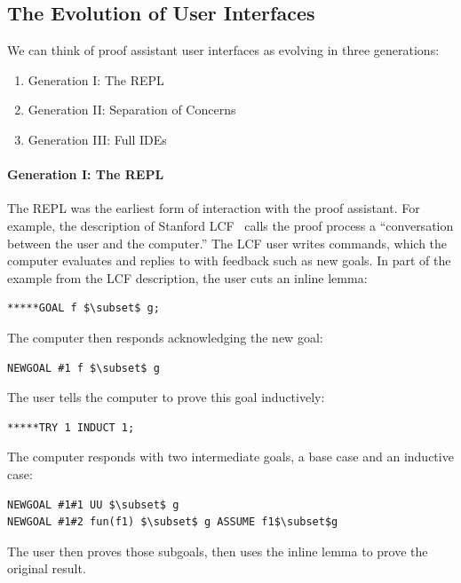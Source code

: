 \subsection{The Evolution of User Interfaces}
\label{sec:uievolve}
We can think of proof assistant user interfaces as evolving in three generations:

\begin{enumerate}
\item Generation I: The REPL
\item Generation II: Separation of Concerns
\item Generation III: Full IDEs
\end{enumerate}

\paragraph{Generation I: The REPL}


The REPL was the earliest form of interaction with the proof assistant.
For example, the description of Stanford LCF~\citep{Milner1972b} calls the proof process a
``conversation between the user and the computer.'' The LCF user writes commands,
which the computer evaluates and replies to with feedback such as new goals.
In part of the example from the LCF description, the user cuts an inline lemma:
\begin{lstlisting}
*****GOAL f $\subset$ g;
\end{lstlisting}
The computer then responds acknowledging the new goal:
\begin{lstlisting}
NEWGOAL #1 f $\subset$ g 
\end{lstlisting}
The user tells the computer to prove this goal inductively:
\begin{lstlisting}
*****TRY 1 INDUCT 1; 
\end{lstlisting}
The computer responds with two intermediate goals, a base case and an inductive case:
\begin{lstlisting}
NEWGOAL #1#1 UU $\subset$ g 
NEWGOAL #1#2 fun(f1) $\subset$ g ASSUME f1$\subset$g 
\end{lstlisting}
The user then proves those subgoals, then uses the inline lemma to prove the original result.

